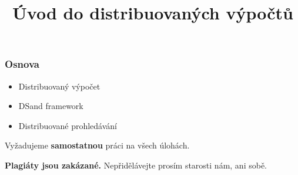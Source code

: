 \documentclass[usenames,dvipsnames,9pt]{beamer}
\title{Úvod do distribuovaných výpočtů}
\date{}
\institute{B4B36PDV -- Paralelní a distribuované výpočty}
\begin{document}
\maketitle

\begin{frame}
  \frametitle{Osnova}
  \begin{itemize}
    \item Distribuovaný výpočet
    \item DSand framework
    \item Distribuované prohledávání%
  \end{itemize}
\end{frame}


%
%
%
%
%
%
%
%
%

\begin{frame}[standout]
  \begin{center}
    \LARGE Vyžadujeme \textbf{samostatnou} práci na všech úlohách.
  \end{center}

  \vspace{2em}

  \faWarning \hspace{3pt}
  \textbf{Plagiáty jsou zakázané.} Nepřidělávejte prosím starosti nám, ani sobě.
\end{frame}
\end{document}
